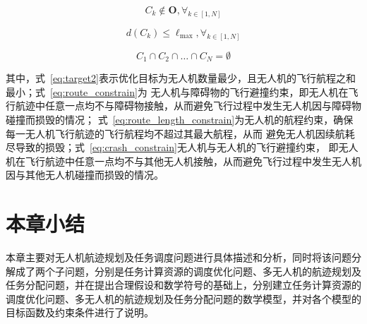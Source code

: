 \begin{equation}
    C_k \notin \mathbf{O}, \forall_{k \in [1, N]} \label{eq:route_constrain}
\end{equation}

\begin{equation}
    d(C_k) \le \ell_\text{max} , \forall_{k \in [1, N]} \label{eq:route_length_constrain}
\end{equation}

\begin{equation}
    C_1 \cap C_2 \cap \ldots \cap C_N = \emptyset \label{eq:crash_constrain}
\end{equation}

其中，式~\ref{eq:target2}表示优化目标为无人机数量最少，且无人机的飞行航程之和最小；式~\ref{eq:route_constrain}为
无人机与障碍物的飞行避撞约束，即无人机在飞行航迹中任意一点均不与障碍物接触，从而避免飞行过程中发生无人机因与障碍物碰撞而损毁的情况；
式~\ref{eq:route_length_constrain}为无人机的航程约束，确保每一无人机飞行航迹的飞行航程均不超过其最大航程，从而
避免无人机因续航耗尽导致的损毁；式~\ref{eq:crash_constrain}无人机与无人机的飞行避撞约束，
即无人机在飞行航迹中任意一点均不与其他无人机接触，从而避免飞行过程中发生无人机因与其他无人机碰撞而损毁的情况。

\section{本章小结}

本章主要对无人机航迹规划及任务调度问题进行具体描述和分析，同时将该问题分解成了两个子问题，分别是任务计算资源的调度优化问题、多无人机的航迹规划及任务分配问题，并在提出合理假设和数学符号的基础上，分别建立任务计算资源的调度优化问题、多无人机的航迹规划及任务分配问题的数学模型，并对各个模型的目标函数及约束条件进行了说明。

\newpage
